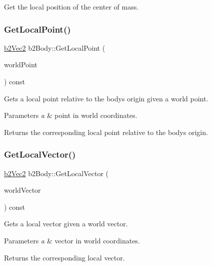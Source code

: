 Get the local position of the center of mass. 

\mbox{\label{classb2_body_a0df8f4312ab23223489323326b2d763d}} 
\subsubsection{\texorpdfstring{GetLocalPoint()}{GetLocalPoint()}}
{\footnotesize\ttfamily \mbox{\hyperlink{structb2_vec2}{b2\+Vec2}} b2\+Body\+::\+Get\+Local\+Point (\begin{DoxyParamCaption}\item[{const \mbox{\hyperlink{structb2_vec2}{b2\+Vec2}} \&}]{world\+Point }\end{DoxyParamCaption}) const\hspace{0.3cm}{\ttfamily [inline]}}

Gets a local point relative to the body\textquotesingle{}s origin given a world point. 
\begin{DoxyParams}{Parameters}
{\em a} & point in world coordinates. \\
\hline
\end{DoxyParams}
\begin{DoxyReturn}{Returns}
the corresponding local point relative to the body\textquotesingle{}s origin. 
\end{DoxyReturn}
\mbox{\label{classb2_body_aed2f88179cedf4cdbdc47429ebe41288}} 
\subsubsection{\texorpdfstring{GetLocalVector()}{GetLocalVector()}}
{\footnotesize\ttfamily \mbox{\hyperlink{structb2_vec2}{b2\+Vec2}} b2\+Body\+::\+Get\+Local\+Vector (\begin{DoxyParamCaption}\item[{const \mbox{\hyperlink{structb2_vec2}{b2\+Vec2}} \&}]{world\+Vector }\end{DoxyParamCaption}) const\hspace{0.3cm}{\ttfamily [inline]}}

Gets a local vector given a world vector. 
\begin{DoxyParams}{Parameters}
{\em a} & vector in world coordinates. \\
\hline
\end{DoxyParams}
\begin{DoxyReturn}{Returns}
the corresponding local vector. 
\end{DoxyReturn}
\mbox{\label{classb2_body_adfeebf45965d131894f728a2f264311d}} 
